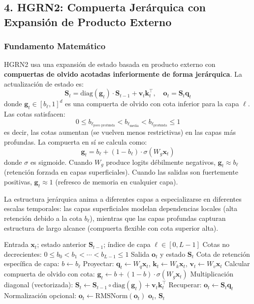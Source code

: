 \subsection{4. HGRN2: Compuerta Jerárquica con Expansión de Producto Externo}

\subsubsection{Fundamento Matemático}

HGRN2 \citep{qin_hgrn2_2024} usa una expansión de estado basada en producto externo con \textbf{compuertas de olvido acotadas inferiormente de forma jerárquica}. La actualización de estado es:
\[
\mathbf{S}_t = \text{diag}(\mathbf{g}_t) \cdot \mathbf{S}_{t-1} + \mathbf{v}_t \mathbf{k}_t^\top, \quad \mathbf{o}_t = \mathbf{S}_t \mathbf{q}_t
\]
donde $\mathbf{g}_t \in [b_\ell, 1]^d$ es una compuerta de olvido con cota inferior para la capa $\ell$. Las cotas satisfacen:
\[
0 \le b_{\ell_{\text{poco profunda}}} < b_{\ell_{\text{media}}} < b_{\ell_{\text{profunda}}} \le 1
\]
es decir, las cotas aumentan (se vuelven menos restrictivas) en las capas más profundas. La compuerta en sí se calcula como:
\[
\mathbf{g}_t = b_\ell + (1 - b_\ell) \cdot \sigma(W_g \mathbf{x}_t)
\]
donde $\sigma$ es sigmoide. Cuando $W_g$ produce logits débilmente negativos, $\mathbf{g}_t \approx b_\ell$ (retención forzada en capas superficiales). Cuando las salidas son fuertemente positivas, $\mathbf{g}_t \approx 1$ (refresco de memoria en cualquier capa).

La estructura jerárquica anima a diferentes capas a especializarse en diferentes escalas temporales: las capas superficiales modelan dependencias locales (alta retención debido a la cota $b_\ell$), mientras que las capas profundas capturan estructura de largo alcance (compuerta flexible con cota superior alta).

\begin{algorithm}[H]
\caption{Paso Adelante de HGRN2 con Cotas Jerárquicas}
\begin{algorithmic}[1]
\Require Entrada $\mathbf{x}_t$; estado anterior $\mathbf{S}_{t-1}$; índice de capa $\ell \in [0, L-1]$
\Require Cotas no decrecientes: $0 \le b_0 < b_1 < \cdots < b_{L-1} \le 1$
\Ensure Salida $\mathbf{o}_t$ y estado $\mathbf{S}_t$
\State Cota de retención específica de capa: $b \gets b_\ell$
\State Proyectar: $\mathbf{q}_t \gets W_q \mathbf{x}_t$, $\mathbf{k}_t \gets W_k \mathbf{x}_t$, $\mathbf{v}_t \gets W_v \mathbf{x}_t$
\State Calcular compuerta de olvido con cota: $\mathbf{g}_t \gets b + (1-b) \cdot \sigma(W_g \mathbf{x}_t)$ 
\State Multiplicación diagonal (vectorizada): $\mathbf{S}_t \gets \mathbf{S}_{t-1} \circ \text{diag}(\mathbf{g}_t) + \mathbf{v}_t \mathbf{k}_t^\top$
\State Recuperar: $\mathbf{o}_t \gets \mathbf{S}_t \mathbf{q}_t$
\State Normalización opcional: $\mathbf{o}_t \gets \text{RMSNorm}(\mathbf{o}_t)$
\Return $\mathbf{o}_t$, $\mathbf{S}_t$
\end{algorithmic}
\end{algorithm}

